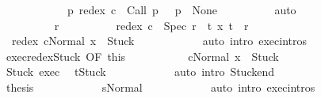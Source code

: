 \begin{isabellebody}
\ \ \ \ \ \ \ \ \ \ \ \ {\isacharparenleft}{\isasymexists}p{\isachardot}\ redex\ c\ {\isacharequal}\ Call\ p\ {\isasymand}\ {\isasymGamma}\ p\ {\isacharequal}\ None{\isacharparenright}{\isachardoublequoteclose}\isanewline
\ \ \ \ \ \ \ \ \isamarkupfalse%
\ auto\isanewline
\ \ \ \ \ \ \isamarkupfalse%
\isanewline
\ \ \ \ \ \ \isacommand{{\isacharbraceleft}}\isamarkupfalse%
\isanewline
\ \ \ \ \ \ \ \ \isamarkupfalse%
\ r\isanewline
\ \ \ \ \ \ \ \ \isamarkupfalse%
\ {\isachardoublequoteopen}redex\ c\ {\isacharequal}\ Spec\ r{\isachardoublequoteclose}\ \ {\isachardoublequoteopen}{\isacharparenleft}{\isasymforall}t{\isachardot}\ {\isacharparenleft}x{\isacharcomma}\ t{\isacharparenright}\ {\isasymnotin}\ r{\isacharparenright}{\isachardoublequoteclose}\isanewline
\ \ \ \ \ \ \ \ \isamarkupfalse%
\ {\isachardoublequoteopen}{\isasymGamma}{\isasymturnstile}\ {\isasymlangle}redex\ cNormal\ x{\isasymrangle}\ {\isasymRightarrow}\ Stuck{\isachardoublequoteclose}\isanewline
\ \ \ \ \ \ \ \ \ \ \isamarkupfalse%
\ {\isacharparenleft}auto\ intro{\isacharcolon}\ exec{\isachardot}intros{\isacharparenright}\isanewline
\ \ \ \ \ \ \ \ \isamarkupfalse%
\ exec{\isacharunderscore}redex{\isacharunderscore}Stuck\ {\isacharbrackleft}OF\ this{\isacharbrackright}\isanewline
\ \ \ \ \ \ \ \ \isamarkupfalse%
\ {\isachardoublequoteopen}{\isasymGamma}{\isasymturnstile}\ {\isasymlangle}cNormal\ x{\isasymrangle}\ {\isasymRightarrow}\ Stuck{\isachardoublequoteclose}\isacommand{{\isachardot}}\isamarkupfalse%
\isanewline
\ \ \ \ \ \ \ \ \isamarkupfalse%
\ \isamarkupfalse%
\ Stuck\ exec{\isacharprime}\ \isamarkupfalse%
\ {\isachardoublequoteopen}t{\isacharequal}Stuck{\isachardoublequoteclose}\isanewline
\ \ \ \ \ \ \ \ \ \ \isamarkupfalse%
\ {\isacharparenleft}auto\ intro{\isacharcolon}\ Stuck{\isacharunderscore}end{\isacharparenright}\isanewline
\ \ \ \ \ \ \ \ \isamarkupfalse%
\isanewline
\ \ \ \ \ \ \ \ \isamarkupfalse%
\ {\isacharquery}thesis\isanewline
\ \ \ \ \ \ \ \ \ \ \isamarkupfalse%
\ s{\isacharunderscore}Normal\isanewline
\ \ \ \ \ \ \ \ \ \ \isamarkupfalse%
\ {\isacharparenleft}auto\ intro{\isacharcolon}\ exec{\isachardot}intros{\isacharparenright}\isanewline

\end{isabellebody}

